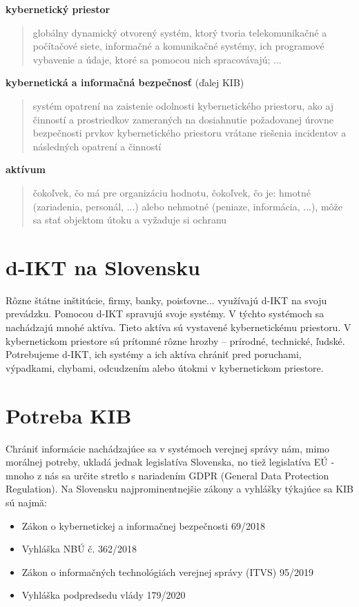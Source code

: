 \textbf{kybernetický priestor}
\begin{quote}
  globálny dynamický otvorený systém, ktorý tvoria
  telekomunikačné a počítačové siete,
  informačné a komunikačné systémy, ich
  programové vybavenie a údaje, ktoré sa
  pomocou nich spracovávajú; ...
\end{quote}


\textbf{kybernetická a informačná bezpečnosť} (ďalej KIB)
\begin{quote}
  systém opatrení na zaistenie odolnosti
  kybernetického priestoru, ako aj činností a
  prostriedkov zameraných na dosiahnutie
  požadovanej úrovne bezpečnosti prvkov
  kybernetického priestoru vrátane riešenia
  incidentov a následných opatrení a činností
\end{quote}

\textbf{aktívum}
\begin{quote}
  čokoľvek, čo má pre organizáciu hodnotu, čokoľvek, čo je: 
    hmotné (zariadenia, personál, ...) alebo nehmotné (peniaze, informácia, ...),
    môže sa stať objektom útoku a
    vyžaduje si ochranu
\end{quote}

\section{d-IKT na Slovensku}
Rôzne štátne inštitúcie, firmy, banky, poisťovne... využívajú d-IKT na svoju prevádzku. Pomocou d-IKT spravujú svoje 
systémy. V týchto systémoch sa nachádzajú mnohé aktíva. Tieto aktíva sú vystavené kybernetickému priestoru. 
V kybernetickom priestore sú prítomné rôzne hrozby -- prírodné, technické, ľudské.
Potrebujeme d-IKT, ich systémy a ich aktíva chrániť pred poruchami, výpadkami, chybami, odcudzením alebo útokmi v 
kybernetickom priestore.

\section{Potreba KIB}
Chrániť informácie nachádzajúce sa v systémoch verejnej správy nám, mimo morálnej potreby, ukladá jednak legislatíva 
Slovenska, no tiež legislatíva EÚ - mnoho z nás sa určite stretlo s nariadením GDPR (General Data Protection Regulation). 
Na Slovensku najprominentnejšie zákony a vyhlášky týkajúce sa KIB sú najmä:

\begin{itemize}
  \item Zákon o kybernetickej a informačnej bezpečnosti 69/2018
  \item Vyhláška NBÚ č. 362/2018
  \item Zákon o informačných technológiách verejnej správy (ITVS) 95/2019
  \item Vyhláška podpredsedu vlády 179/2020
\end{itemize}

